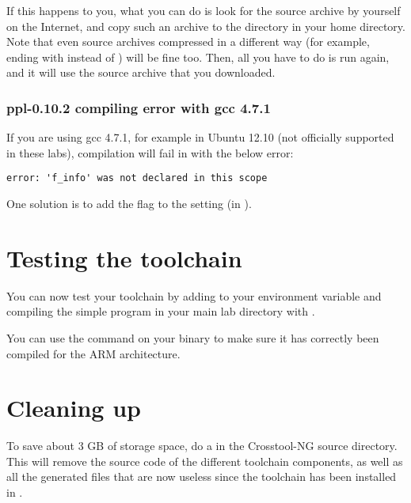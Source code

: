 If this happens to you, what you can do is look for the source archive by
yourself on the Internet, and copy such an archive to the 
directory in your home directory. Note that even source archives
compressed in a different way (for example, ending with 
instead of ) will be fine too. Then, all you have to do is run
 again, and it will use the source archive that you
downloaded.

\subsubsection{ppl-0.10.2 compiling error with gcc 4.7.1}

If you are using gcc 4.7.1, for example in Ubuntu 12.10 (not officially
supported in these labs), compilation will fail in  with
the below error:

\begin{verbatim}
error: 'f_info' was not declared in this scope
\end{verbatim}

One solution is to add the  flag to the
 setting (in ).

\section{Testing the toolchain}

You can now test your toolchain by adding
 to your
 environment variable and compiling the simple
 program in your main lab directory with
.

You can use the  command on your binary to make sure it has
correctly been compiled for the ARM architecture.

\section{Cleaning up}

To save about 3 GB of storage space, do a  in the
Crosstool-NG source directory. This will remove the source code of the
different toolchain components, as well as all the generated files
that are now useless since the toolchain has been installed in
.
